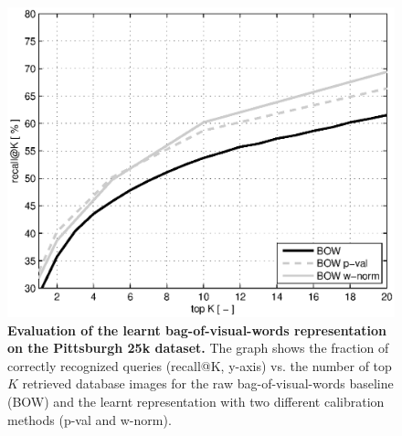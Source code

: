    \begin{figure}[tbp]
        \centering
        \includegraphics[width=1.1\linewidth]{imgs/plotPitt25kBOW}  
        \caption{
            \textbf{Evaluation of the learnt bag-of-visual-words representation on the Pittsburgh 25k \cite{Gronat13} dataset.} The graph shows the fraction of correctly recognized queries (recall@K, y-axis) vs. the number of top $K$ retrieved database images for the raw bag-of-visual-words baseline (BOW) and the learnt representation with two different calibration methods (p-val and w-norm).
        }
        \label{fig:recallBOW}
    \end{figure}

